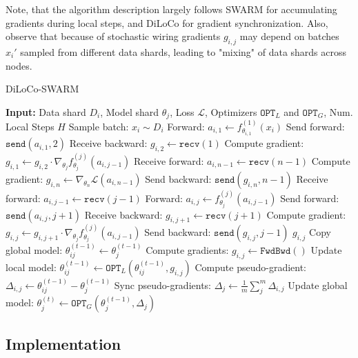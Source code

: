 \documentclass{article}
\begin{document}
Note, that the algorithm description largely follows SWARM for accumulating
gradients during local steps, and DiLoCo for gradient synchronization.  Also,
observe that because of stochastic wiring gradients $g_{i,j}$ may depend on
batches $x_i'$ sampled from different data shards, leading to "mixing" of data
shards across nodes.

\begin{algorithm}
\caption{DiLoCo-SWARM}
\label{alg:diloco-swarm}
\begin{algorithmic}[1]
\State \textbf{Input:} Data shard $D_i$, Model shard $\theta_j$, Loss $\mathcal{L}$, Optimizers $\mathtt{OPT}_{L}$ and $\mathtt{OPT}_{G}$, Num. Local Steps $H$
   
    \State Sample batch: $x_i \sim D_i$
      \State Forward: $a_{i,1} \gets f^{(1)}_{\theta_{i,1}}(x_i)$
      \State Send forward: $\mathtt{send}(a_{i,1}, 2)$ 
      \State Receive backward: $g_{i,2} \gets \mathtt{recv}(1)$
      \State Compute gradient: $g_{i,1} \gets g_{i,2} \cdot \nabla_{\theta_j} f^{(j)}_{\theta_j}(a_{i,j-1})$
   
      \State Receive forward: $a_{i,n-1} \gets \mathtt{recv}(n-1)$
      \State Compute gradient: $g_{i,n} \gets \nabla_{\theta_n} \mathcal{L}(a_{i,n-1})$
      \State Send backward: $\mathtt{send}(g_{i,n}, n-1)$
  \Else {}
      \State Receive forward: $a_{i,j-1} \gets \mathtt{recv}(j-1)$
      \State Forward: $a_{i,j} \gets f^{(j)}_{\theta_j}(a_{i,j-1})$
      \State Send forward: $\mathtt{send}(a_{i,j}, j+1)$
      \State Receive backward: $g_{i,j+1} \gets \mathtt{recv}(j+1)$
      \State Compute gradient: $g_{i,j} \gets g_{i,j+1} \cdot \nabla_{\theta_j} f^{(j)}_{\theta_j}(a_{i,j-1})$
      \State Send backward: $\mathtt{send}(g_{i,j}, j-1)$
  \EndIf
  \Return $g_{i,j}$
\EndProcedure
\State Copy global model: $\theta_{ij}^{(t-1)} \gets \theta_j^{(t-1)}$
  \State Compute gradients: $g_{i,j} \gets \mathtt{FwdBwd}()$
  \State Update local model: $\theta_{ij}^{(t-1)} \gets \mathtt{OPT}_{L}(\theta_{ij}^{(t-1)}, g_{i,j})$
\EndFor
\State Compute pseudo-gradient: $\Delta_{i,j} \gets \theta_{ij}^{(t-1)} - \theta_j^{(t-1)}$
\State Sync pseudo-gradients: $\Delta_j \gets \frac{1}{m}\sum_j^m \Delta_{i,j}$
\State Update global model: $\theta_j^{(t)} \gets \mathtt{OPT}_{G}(\theta_j^{(t-1)}, \Delta_j)$
\end{algorithmic}
\end{algorithm}

\subsection{Implementation}
\end{document}
